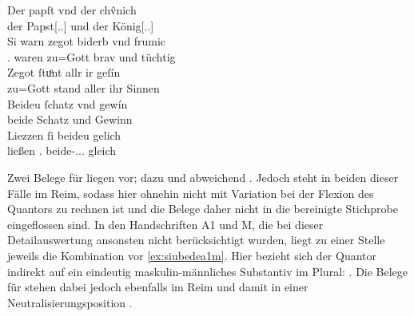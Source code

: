\begin{exe}
\ex\label{ex:papstkoenig3} %
	\gll Der papſt vnd der chv̂nich \\
		der Papst[\Nom.\Sg.\MascM] und der König[\Nom.\Sg.\MascM] \\
\sn \gll Si warn zegot biderb vnd frumic \\
		\Tpl\subM.\Nom{} waren {zu=Gott} brav und tüchtig \\
\sn \gll Zegot ſtuͦnt allr ir geſín \\
		{zu=Gott} stand aller ihr Sinnen \\
\sn \gll Beideu ſchatz vnd gewín \\
		beide Schatz und Gewinn \\
\sn \gll Liezzen ſi beideu gelich \\
		ließen \Tpl\subM.\Nom{} beide-\Nom.\Pl.\NeutM.\St{} gleich \\
	\begin{taggedline}{\parencites[\pno~17vb,30--34]{kc:B1}[vgl. abweichend][6110--6113]{schroeder1895}}
	\trans {}
	\end{taggedline}
\end{exe}

Zwei Belege für  liegen \citet[\pno~21ra,25--31 und 22ra,34--22rb,6]{kc:VB} vor; dazu \citet[4255--4261]{schroeder1895} und
abweichend \citet[4455--4470]{schroeder1895}. Jedoch steht  in
beiden dieser Fälle im Reim, sodass hier ohnehin nicht mit Variation bei der
Flexion des Quantors zu rechnen ist und die Belege daher nicht in die
bereinigte Stichprobe eingeflossen sind. In den Handschriften A1 und
M, die bei dieser Detailauswertung ansonsten nicht berücksichtigt
wurden, liegt zu einer Stelle jeweils die Kombination  vor
\cref{ex:siubedea1m}. Hier bezieht sich der Quantor indirekt auf ein eindeutig
maskulin-männliches Substantiv im Plural:
 . Die Belege für  stehen dabei jedoch
ebenfalls im Reim und damit in einer Neutralisierungsposition
\autocites[vgl.][662--663]{grimm1870}[89]{askedal1973}.

